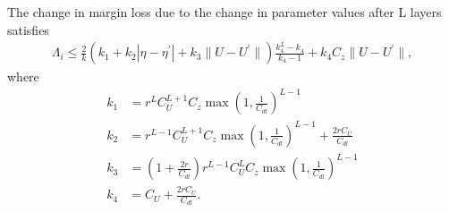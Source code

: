 \begin{lemma}
    The change in margin loss due to the change in parameter values after L layers satisfies
    \begin{align*}
        \Lambda_{i} \leq  \frac{2}{k} \left(k_1 + k_2|\eta-\eta^\prime| + k_3 \|U - U^{\prime}\|\right) \frac{k_4^L - k_4}{k_4 - 1} + k_4 C_z \|U - U^\prime\|,
    \end{align*}
    where 
    \begin{align*}
        k_1 &= r^L C_U^{L+1} C_z \max\left(1, \frac{1}{C_{dl}}\right)^{L-1}\\
        k_2 &= r^{L-1} C_U^{L+1} C_z \max\left(1, \frac{1}{C_{dl}}\right)^{L-1} + \frac{2rC_U}{C_{dl}}\\
        k_3 &= \left(1 + \frac{2r}{C_{dl}}\right)r^{L-1} C_U^{L} C_z \max\left(1, \frac{1}{C_{dl}}\right)^{L-1}\\
        k_4 &= C_U + \frac{2rC_U}{C_{dl}}.
    \end{align*}
\end{lemma}
